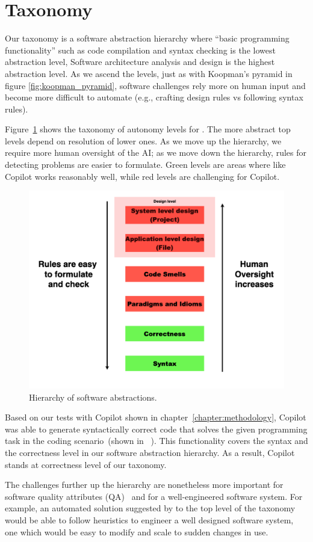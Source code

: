 \section{Taxonomy}
\label{taxonomy}
Our taxonomy is a software abstraction hierarchy where ``basic programming functionality'' such as code compilation and syntax checking is the lowest abstraction level,
Software architecture analysis and design is the highest abstraction level.
As we ascend the levels, just as with Koopman's pyramid in figure \ref{fig:koopman_pyramid}, 
software challenges rely more on human input and become more difficult to automate (e.g., crafting design rules vs following syntax rules).

Figure~\ref{fig:taxonomy} shows the taxonomy of autonomy levels for \cct{}. The more abstract top levels depend on resolution of lower ones. As we move up the hierarchy, we require more human oversight of the AI; as we move down the hierarchy, rules for detecting problems are easier to formulate. Green levels are areas where \cct{} like Copilot works reasonably well, while red levels are challenging for Copilot.

\begin{figure}[hbt!]
    \centering
    \includegraphics[width=\linewidth]{Figures/taxonomy.png}
    \caption{Hierarchy of software abstractions.}
    \label{fig:taxonomy}
\end{figure}

Based on our tests with Copilot shown in chapter~\ref{chapter:methodology}, Copilot was able to generate syntactically correct code that solves the given programming task in the coding scenario~(shown in ~\repl{}).
This functionality covers the syntax and the correctness level in our software abstraction hierarchy.
As a result, Copilot stands at correctness level of our taxonomy. 

The challenges further up the hierarchy are nonetheless more important for software quality attributes (QA)~\cite{Ernst2017} and for a well-engineered software system.
For example, an automated solution suggested by \cct{} to the top level of the taxonomy would be able to follow heuristics to engineer a well designed software system, one which would be easy to modify and scale to sudden changes in use.
